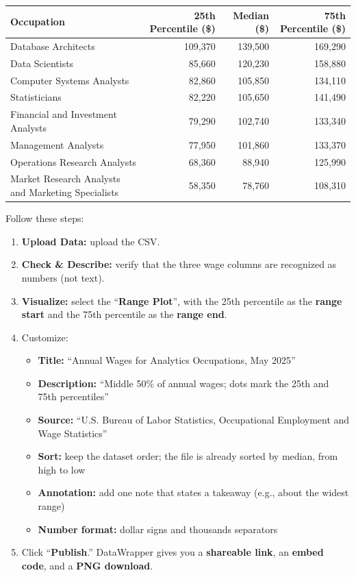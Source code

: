 \documentclass[letterpaper,addpoints, 11pt]{exam}
\begin{document}
\begin{questions}
\begin{enumerate}[label=(\Alph*)]
	\medskip
	\begin{center}
	\small
	\begin{tabular}{l r r r}
		\hline
		\textbf{Occupation} & \textbf{25th Percentile (\$)} & \textbf{Median (\$)} & \textbf{75th Percentile (\$)} \\
		\hline
		Database Architects & 109,370 & 139,500 & 169,290 \\
		Data Scientists & 85,660 & 120,230 & 158,880 \\
		Computer Systems Analysts & 82,860 & 105,850 & 134,110 \\
		Statisticians & 82,220 & 105,650 & 141,490 \\
		Financial and Investment Analysts & 79,290 & 102,740 & 133,340 \\
		Management Analysts & 77,950 & 101,860 & 133,370 \\
		Operations Research Analysts & 68,360 & 88,940 & 125,990 \\
		Market Research Analysts and Marketing Specialists & 58,350 & 78,760 & 108,310 \\
		\hline
	\end{tabular}
	\end{center}
	\medskip

	\noindent Follow these steps:
	\begin{enumerate}[nosep, label=\arabic*.]
		\item \textbf{Upload Data:} upload the CSV.
		\item \textbf{Check \& Describe:} verify that the three wage columns are recognized as numbers (not text).
		\item \textbf{Visualize:} select the ``\textbf{Range Plot}'', with the 25th percentile as the \textbf{range start} and the 75th percentile as the \textbf{range end}.
		\item Customize:
		\begin{itemize}[nosep]
			\item \textbf{Title:} ``Annual Wages for Analytics Occupations, May 2025''
			\item \textbf{Description:} ``Middle 50\% of annual wages; dots mark the 25th and 75th percentiles''
			\item \textbf{Source:} ``U.S. Bureau of Labor Statistics, Occupational Employment and Wage Statistics''
			\item \textbf{Sort:} keep the dataset order; the file is already sorted by median, from high to low
			\item \textbf{Annotation:} add one note that states a takeaway (e.g., about the widest range)
			\item \textbf{Number format:} dollar signs and thousands separators
		\end{itemize}
		\item Click ``\textbf{Publish}.'' DataWrapper gives you a \textbf{shareable link}, an \textbf{embed code}, and a \textbf{PNG download}.
	\end{enumerate}
\end{enumerate}

\end{questions}
\end{document}
